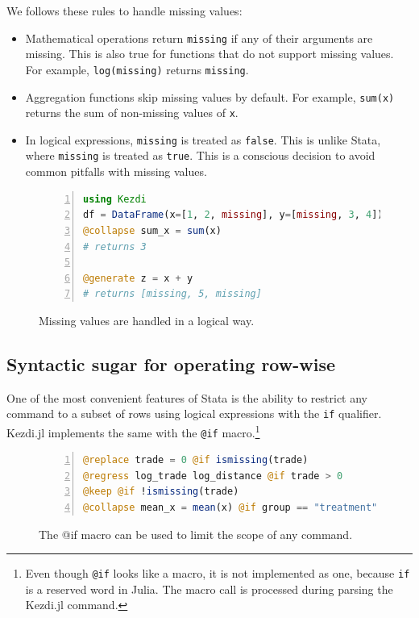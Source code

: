 \documentclass{juliacon}
\begin{document}
We follows these rules to handle missing values:
\begin{itemize}
\item Mathematical operations return \texttt{missing} if any of their arguments are missing. This is also true for functions that do not support missing values. For example, \texttt{log(missing)} returns \texttt{missing}.
\item Aggregation functions skip missing values by default. For example, \texttt{sum(x)} returns the sum of non-missing values of \texttt{x}.
\item In logical expressions, \texttt{missing} is treated as \texttt{false}. This is unlike Stata, where \texttt{missing} is treated as \texttt{true}. This is a conscious decision to avoid common pitfalls with missing values.
\end{itemize}


\begin{figure}[t]
\begin{lstlisting}[language = Julia, numbers=left, numberstyle=\tiny\color{gray}]
using Kezdi
df = DataFrame(x=[1, 2, missing], y=[missing, 3, 4])
@collapse sum_x = sum(x)
# returns 3

@generate z = x + y
# returns [missing, 5, missing]
\end{lstlisting}
	
\caption{Missing values are handled in a logical way.}
\label{fig:missing}
\end{figure}

\subsection{Syntactic sugar for operating row-wise}

One of the most convenient features of Stata is the ability to restrict any command to a subset of rows using logical expressions with the \texttt{if} qualifier. Kezdi.jl implements the same with the \texttt{@if} macro.\footnote{Even though \texttt{@if} looks like a macro, it is not implemented as one, because \texttt{if} is a reserved word in Julia. The macro call is processed during parsing the Kezdi.jl command.} 

\begin{figure}[t]
\begin{lstlisting}[language = Julia, numbers=left, numberstyle=\tiny\color{gray}]
@replace trade = 0 @if ismissing(trade)
@regress log_trade log_distance @if trade > 0
@keep @if !ismissing(trade) 
@collapse mean_x = mean(x) @if group == "treatment"		
\end{lstlisting}
\caption{The @if macro can be used to limit the scope of any command.}
\label{fig:ifmacro}
\end{figure}
\end{document}
